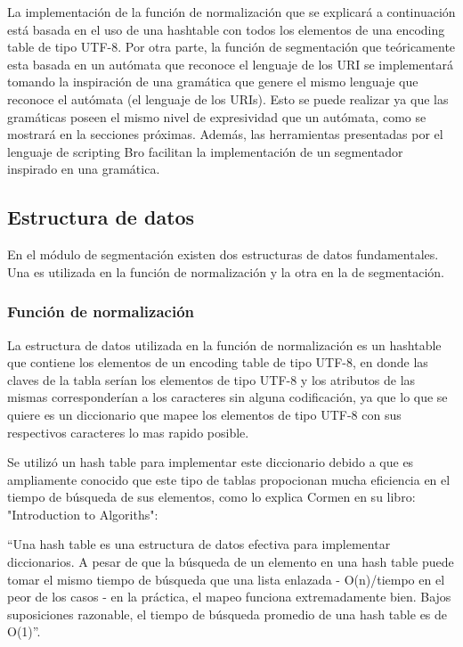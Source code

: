 La implementación de la función de normalización que se explicará a continuación está basada en el uso de una hashtable con todos los elementos de una encoding table de tipo UTF-8. Por otra parte, la función de segmentación que teóricamente esta basada en un autómata que reconoce el lenguaje de los URI se implementará tomando la inspiración de una gramática que genere el mismo lenguaje que reconoce el autómata (el lenguaje de los URIs). Esto se puede realizar ya que las gramáticas poseen el mismo nivel de expresividad que un autómata, como se mostrará en la secciones próximas. Además, las herramientas presentadas por el lenguaje de scripting Bro facilitan la implementación de un segmentador inspirado en una gramática.

\subsection{Estructura de datos}
En el módulo de segmentación existen dos estructuras de datos fundamentales. Una es utilizada en la función de normalización y la otra en la de segmentación.

\subsubsection{Función de normalización}
\label{sssec:estructuraNormalizacion}

La estructura de datos utilizada en la función de normalización es un hashtable que contiene los elementos de un encoding table de tipo UTF-8, en donde las claves de la tabla serían los elementos de tipo UTF-8 y los atributos de las mismas corresponderían a los caracteres sin alguna codificación, ya que lo que se quiere es un diccionario que mapee los elementos de tipo UTF-8 con sus respectivos caracteres lo mas rapido posible.

Se utilizó un hash table para implementar este diccionario debido a que es ampliamente conocido que este tipo de tablas propocionan mucha eficiencia en el tiempo de búsqueda de sus elementos, como lo explica Cormen en su libro: "Introduction to Algoriths":

“Una hash table es una estructura de datos efectiva para implementar diccionarios. A pesar de que la búsqueda de un elemento en una hash table puede tomar el mismo tiempo de búsqueda que una lista enlazada - O(n)/tiempo en el peor de los casos - en la práctica, el mapeo funciona extremadamente bien.  Bajos suposiciones razonable, el tiempo de búsqueda promedio de una hash table es de O(1)”.

